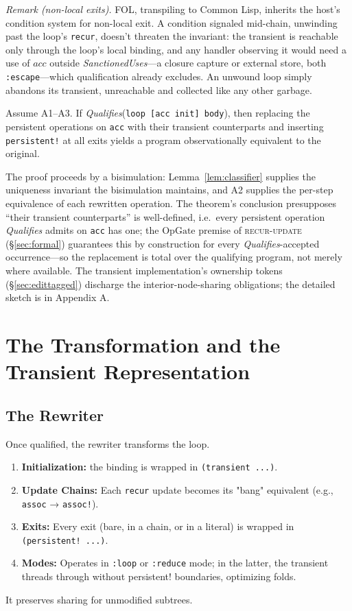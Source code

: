 \documentclass[sigplan,review,anonymous]{acmart}
\begin{document}
\emph{Remark (non-local exits).} FOL, transpiling to Common Lisp, inherits the host's condition system for non-local exit. A condition signaled mid-chain, unwinding past the loop's \texttt{recur}, doesn't threaten the invariant: the transient is reachable only through the loop's local binding, and any handler observing it would need a use of $acc$ outside \emph{SanctionedUses}---a closure capture or external store, both \texttt{:escape}---which qualification already excludes. An unwound loop simply abandons its transient, unreachable and collected like any other garbage.

\begin{theorem}
\label{thm:sound}
Assume A1--A3. If \emph{Qualifies}(\texttt{loop [acc init] body}), then replacing the persistent operations on \texttt{acc} with their transient counterparts and inserting \texttt{persistent!} at all exits yields a program observationally equivalent to the original.
\end{theorem}

The proof proceeds by a bisimulation: Lemma~\ref{lem:classifier} supplies the uniqueness invariant the bisimulation maintains, and A2 supplies the per-step equivalence of each rewritten operation. The theorem's conclusion presupposes ``their transient counterparts'' is well-defined, i.e.\ every persistent operation \emph{Qualifies} admits on \texttt{acc} has one; the $\mathrm{OpGate}$ premise of \textsc{recur-update} (§\ref{sec:formal}) guarantees this by construction for every \emph{Qualifies}-accepted occurrence---so the replacement is total over the qualifying program, not merely where available. The transient implementation's ownership tokens (§\ref{sec:edittagged}) discharge the interior-node-sharing obligations; the detailed sketch is in Appendix A.

\section{The Transformation and the Transient Representation}
\label{sec:transformation}
\subsection{The Rewriter}
Once qualified, the rewriter transforms the loop.
\begin{enumerate}
    \item \textbf{Initialization:} the binding is wrapped in \texttt{(transient ...)}.
    \item \textbf{Update Chains:} Each \texttt{recur} update becomes its "bang" equivalent (e.g., \texttt{assoc} → \texttt{assoc!}).
    \item \textbf{Exits:} Every exit (bare, in a chain, or in a literal) is wrapped in \texttt{(persistent! ...)}.
    \item \textbf{Modes:} Operates in \texttt{:loop} or \texttt{:reduce} mode; in the latter, the transient threads through without persistent! boundaries, optimizing folds.
\end{enumerate}
It preserves sharing for unmodified subtrees.
\end{document}
